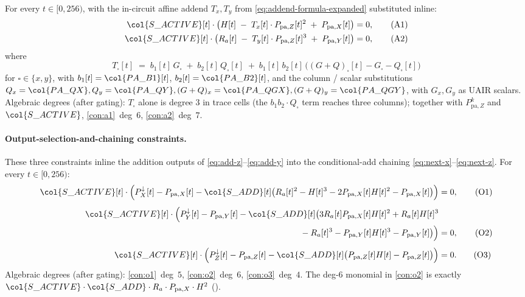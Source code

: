 For every $t \in [0, 256)$, with the in-circuit affine addend
$T_x, T_y$ from \eqref{eq:addend-formula-expanded} substituted
inline:
\begin{align}
\col{S\_ACTIVE}[t] \cdot \bigl(H[t] \;-\; T_x[t] \cdot P_{\mathrm{pa},Z}[t]^2 \;+\; P_{\mathrm{pa},X}[t]\bigr) &= 0,\tag{A1}\label{con:a1}\\
\col{S\_ACTIVE}[t] \cdot \bigl(R_a[t] \;-\; T_y[t] \cdot P_{\mathrm{pa},Z}[t]^3 \;+\; P_{\mathrm{pa},Y}[t]\bigr) &= 0,\tag{A2}\label{con:a2}
\end{align}
where
\[
  T_\square[t] \;=\; b_1[t]\, G_\square \;+\; b_2[t]\, Q_\square[t]
                  \;+\; b_1[t]\, b_2[t]\,\bigl((G+Q)_\square[t] - G_\square - Q_\square[t]\bigr)
\]
for $\square \in \{x, y\}$, with $b_1[t] = \col{PA\_B1}[t]$,
$b_2[t] = \col{PA\_B2}[t]$, and the column / scalar substitutions
$Q_x = \col{PA\_QX}, Q_y = \col{PA\_QY}, (G+Q)_x = \col{PA\_QGX},
(G+Q)_y = \col{PA\_QGY}$, with $G_x, G_y$ as UAIR scalars.
Algebraic degrees (after gating): $T_\square$ alone is degree $3$
in trace cells (the $b_1 b_2 \cdot Q_\square$ term reaches three
columns); together with $P_{\mathrm{pa},Z}^k$ and $\col{S\_ACTIVE}$,
\ref{con:a1}~deg~$6$, \ref{con:a2}~deg~$7$.

\paragraph{Output-selection-and-chaining constraints.}

These three constraints inline the addition outputs of
\eqref{eq:add-z}--\eqref{eq:add-y} into the conditional-add chaining
\eqref{eq:next-x}--\eqref{eq:next-z}. For every $t \in [0, 256)$:
\begin{align}
\col{S\_ACTIVE}[t] \cdot \Bigl(P_X^{\downarrow}[t] - P_{\mathrm{pa},X}[t]
   - \col{S\_ADD}[t] \bigl(R_a[t]^2 - H[t]^3 - 2 P_{\mathrm{pa},X}[t] H[t]^2 - P_{\mathrm{pa},X}[t]\bigr)\Bigr) &= 0, \tag{O1}\label{con:o1}\\[4pt]
\col{S\_ACTIVE}[t] \cdot \Bigl(P_Y^{\downarrow}[t] - P_{\mathrm{pa},Y}[t]
   - \col{S\_ADD}[t] \bigl(3 R_a[t] P_{\mathrm{pa},X}[t] H[t]^2 + R_a[t] H[t]^3 \notag\\
   {} - R_a[t]^3 - P_{\mathrm{pa},Y}[t] H[t]^3 - P_{\mathrm{pa},Y}[t]\bigr)\Bigr) &= 0, \tag{O2}\label{con:o2}\\[4pt]
\col{S\_ACTIVE}[t] \cdot \Bigl(P_Z^{\downarrow}[t] - P_{\mathrm{pa},Z}[t]
   - \col{S\_ADD}[t] \bigl(P_{\mathrm{pa},Z}[t] H[t] - P_{\mathrm{pa},Z}[t]\bigr)\Bigr) &= 0. \tag{O3}\label{con:o3}
\end{align}
Algebraic degrees (after gating): \ref{con:o1}~deg~$5$, \ref{con:o2}~deg~$6$, \ref{con:o3}~deg~$4$. The deg-$6$ monomial in
\ref{con:o2} is exactly $\col{S\_ACTIVE} \cdot \col{S\_ADD} \cdot R_a \cdot P_{\mathrm{pa},X} \cdot H^2$ ().


